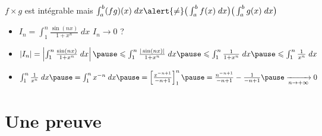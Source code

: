 \begin{frame}

\begin{proposition}
\raisebox{13pt}{\ $|f|$ est intégrable sur $[a,b]$ \ \ et} \pause
{}
\end{proposition}

\pause
\medskip

$f \times g$ est intégrable \pause
mais $\int_a^b (f g)(x)\;dx \alert{\neq}
\big(\int_a^b f(x)\;dx\big)\big(\int_a^b g(x)\;dx\big)$

\pause
\medskip

\begin{exemple}

\begin{itemize}
  \item $I_n = \int_1^n \frac{\sin(n x)}{1+x^n} \; dx$ \pause \quad  $I_n \to 0$ ?

\pause
\smallskip

  \item $|I_n| = \left| \int_1^n \frac{\sin(n x)}{1+x^n} \; dx \right| \pause\le  \int_1^n  \frac{|\sin(n x)|}{1+x^n} \; dx
\pause\le \int_1^n  \frac{1}{1+x^n} \; dx \pause\le  \int_1^n  \frac{1}{x^n} \; dx$

\pause
\smallskip

  \item  $\int_1^n  \frac{1}{x^n} \; dx \pause= \int_1^n x^{-n} \; dx \pause= \left[\frac{x^{-n+1}}{-n+1}\right]_1^n 
\pause= \frac{n^{-n+1}}{-n+1} - \frac{1}{-n+1}  \pause\xrightarrow[n\to+\infty]{} 0$
\end{itemize}

\end{exemple}
\end{frame}



\section*{Une preuve}


